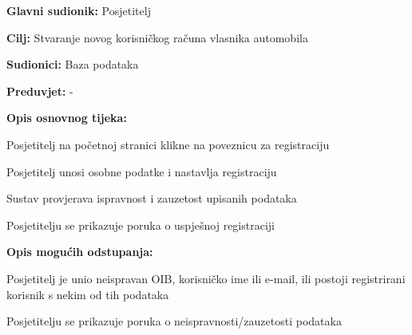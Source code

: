 \noindent {}
\begin{packed_item}
	
	\item \textbf{Glavni sudionik: } Posjetitelj
	\item  \textbf{Cilj:} Stvaranje novog korisničkog računa vlasnika
	automobila
	\item  \textbf{Sudionici:} Baza podataka
	\item  \textbf{Preduvjet:} -
	\item  \textbf{Opis osnovnog tijeka:} 
	
	\item[] \begin{packed_enum}
		
		\item Posjetitelj na početnoj stranici klikne na poveznicu za
		registraciju
		\item Posjetitelj unosi osobne podatke i nastavlja registraciju
		\item Sustav provjerava ispravnost i zauzetost upisanih podataka
		\item Posjetitelju se prikazuje poruka o uspješnoj registraciji
	\end{packed_enum}
	
	\item  \textbf{Opis mogućih odstupanja:}
	
	\item[] \begin{packed_item}
		
		\item[3.a] Posjetitelj je unio neispravan OIB, korisničko ime ili e-mail,
		ili postoji registrirani korisnik s nekim od tih podataka
		\item[] \begin{packed_enum}
			
			\item Posjetitelju se prikazuje poruka o neispravnosti/zauzetosti
			podataka
			
		\end{packed_enum}
		
	\end{packed_item}
\end{packed_item}

